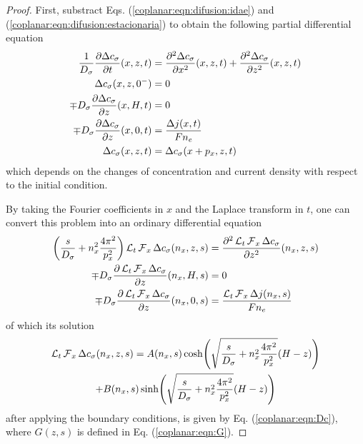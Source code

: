 \begin{proof}
	First, substract Eqs. (\ref{coplanar:eqn:difusion:idae})
	and (\ref{coplanar:eqn:difusion:estacionaria})
	to obtain the following partial differential equation
	\begin{subequations}
		\begin{align}
			\frac{1}{D_{\sigma}} \frac{\partial \Delta c_{\sigma}}{\partial t}(x,z,t)
			&= \frac{\partial ^2 \Delta c_{\sigma}}{\partial x^2}(x,z,t)
			+ \frac{\partial ^2 \Delta c_{\sigma}}{\partial z^2}(x,z,t)
			\\
			\Delta c_{\sigma}(x,z,0^{-}) &= 0
			\\
			\mp D_{\sigma} \frac{\partial \Delta c_{\sigma}}{\partial z}(x,H,t) &= 0
			\\
			\mp D_{\sigma} \frac{\partial \Delta c_{\sigma}}{\partial z}(x,0,t)
			&= \frac{\Delta j(x,t)}{F n_{e}}
			\\
			\Delta c_{\sigma}(x, z, t) &= \Delta c_{\sigma}(x + p_{x}, z, t)
		\end{align}
	\end{subequations}
	which depends on the changes of concentration and current density
	with respect to the initial condition.

	By taking the Fourier coefficients in $x$ and the Laplace transform in $t$,
	one can convert this problem into an ordinary differential equation
	\begin{subequations}
		\begin{align}
			\left(
				\frac{s}{D_{\sigma}} + n_{x}^{2} \frac{4\pi^{2}}{p_{x}^{2}}
			\right)
			\operatorname{\mathcal{L}}_{t} \operatorname{\mathcal{F}}_{x} \Delta c_{\sigma}(n_{x},z,s)
			&= \frac{\partial ^2 \operatorname{\mathcal{L}}_{t} \operatorname{\mathcal{F}}_{x} \Delta c_{\sigma}}{\partial z^2}(n_{x},z,s)
			\\
			\mp D_{\sigma} \frac{\partial \operatorname{\mathcal{L}}_{t} \operatorname{\mathcal{F}}_{x} \Delta c_{\sigma}}{\partial z}(n_{x},H,s)
			&= 0
			\\
			\mp D_{\sigma} \frac{\partial \operatorname{\mathcal{L}}_{t} \operatorname{\mathcal{F}}_{x} \Delta c_{\sigma}}{\partial z}(n_{x},0,s)
			&= \frac{\operatorname{\mathcal{L}}_{t} \operatorname{\mathcal{F}}_{x} \Delta j(n_{x},s)}{F n_{e}}
		\end{align}
	\end{subequations}
	of which its solution
	\begin{multline}
		\operatorname{\mathcal{L}}_{t} \operatorname{\mathcal{F}}_{x} \Delta c_{\sigma}(n_{x},z,s) =
		A(n_{x},s) \cosh\!\left(
			\sqrt{\frac{s}{D_{\sigma}} + n_{x}^{2} \frac{4\pi^{2}}{p_{x}^{2}}}
			(H - z)
		\right)
		\\
		+ B(n_{x},s) \sinh\!\left( 
			\sqrt{\frac{s}{D_{\sigma}} + n_{x}^{2} \frac{4\pi^{2}}{p_{x}^{2}}}
			(H - z)
		\right)
	\end{multline}
	after applying the boundary conditions, 
	is given by Eq. (\ref{coplanar:eqn:Dc}),
	where $G(z,s)$ is defined in Eq. (\ref{coplanar:eqn:G}).
\end{proof}


